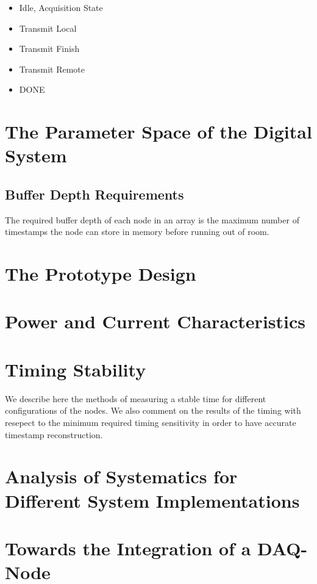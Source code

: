 \begin{itemize}
    \item Idle, Acquisition State
    \item Transmit Local
    \item Transmit Finish
    \item Transmit Remote
    \item DONE
\end{itemize}
\label{fsm_state_labels}

\section{The Parameter Space of the Digital System}


\subsection{Buffer Depth Requirements}

The required buffer depth of each node in an array is the maximum number of timestamps the node can store in memory before running out of room.

\section{The Prototype Design}


\section{Power and Current Characteristics}



\section{Timing Stability}

We describe here the methods of measuring a stable time for different configurations of the nodes. 
We also comment on the results of the timing with resepect to the minimum required timing sensitivity in order to have accurate timestamp reconstruction.

\section{Analysis of Systematics for Different System Implementations}

\section{Towards the Integration of a DAQ-Node}

